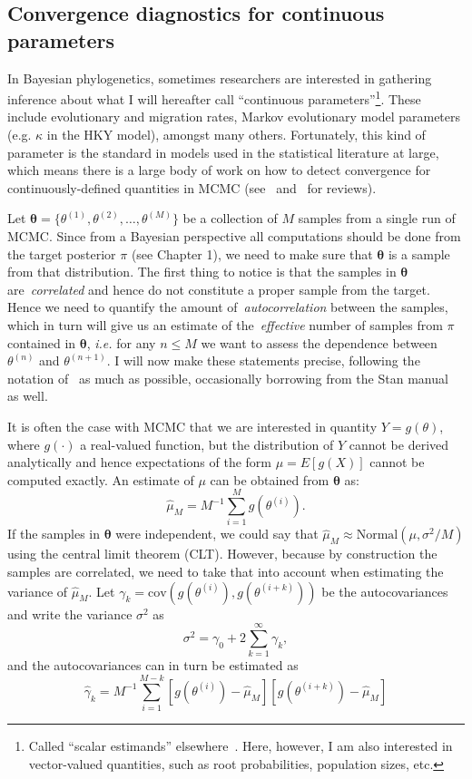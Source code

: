\subsection{Convergence diagnostics for continuous parameters}
\label{sec:continuous}

In Bayesian phylogenetics, sometimes researchers are interested in gathering inference about what I will hereafter call ``continuous parameters''\footnote{Called ``scalar estimands'' elsewhere~\citep{Gelman2014b}. Here, however, I am also interested in vector-valued quantities, such as root probabilities, population sizes,  etc.}.
These include evolutionary and migration rates, Markov evolutionary model parameters (e.g. $\kappa$ in the HKY model), amongst many others.
Fortunately, this kind of parameter is the standard in models used in the statistical literature at large, which means there is a large body of work on how to detect convergence for continuously-defined quantities in MCMC (see~\cite{Cowles1996} and~\cite{Mengersen1999} for reviews).

Let $\boldsymbol\theta = \{\theta^{(1)}, \theta^{(2)}, \ldots, \theta^{(M)}\}$ be a collection of $M$ samples from a single run of MCMC.
Since from a Bayesian perspective all computations should be done from the target posterior $\pi$ (see Chapter 1), we need to make sure that $\boldsymbol\theta$ is a sample from that distribution.
The first thing to notice is that the samples in $\boldsymbol\theta$ are~\textit{correlated} and hence do not constitute a proper sample from the target.
Hence we need to quantify the amount of~\textit{autocorrelation} between the samples, which in turn will give us an estimate of the~\textit{effective} number of samples from $\pi$ contained in $\boldsymbol\theta$, \textit{i.e.} for any $n \leq M$ we want to assess the dependence between $\theta^{(n)}$ and $\theta^{(n + 1)}$.
I will now make these statements precise, following the notation of~\cite{Geyer2011} as much as possible, occasionally borrowing from the Stan manual~\citep{StanTeam2017} as well.

It is often the case with MCMC that we are interested in quantity $Y = g(\theta)$, where $g(\cdot)$ a real-valued function, but the distribution of $Y$ cannot be derived analytically and hence expectations of the form $\mu = E[g(X)]$ cannot be computed exactly. 
An estimate of $\mu$ can be obtained from $\boldsymbol\theta$ as:
\[ \hat{\mu}_M = M^{-1}\sum_{i = 1}^M g(\theta^{(i)}). \]
If the samples in $\boldsymbol\theta$ were independent, we could say that $\hat{\mu}_M \approx \text{Normal} (\mu, \sigma^2/M)$ using the central limit theorem (CLT).
However, because by construction the samples are correlated, we need to take that into account when estimating the variance of $\hat{\mu}_M$.
Let $\gamma_k = \text{cov}(g(\theta^{(i)}), g(\theta^{(i + k)}))$ be the autocovariances and write the variance $\sigma^2$ as 
\[ \sigma^2 =  \gamma_0 + 2\sum_{k=1}^\infty \gamma_k,\]
and the autocovariances can in turn be estimated as 
\begin{equation}
\label{eq:autocovs}
 \hat{\gamma}_k = M^{-1}\sum_{i = 1}^{M-k}[g(\theta^{(i)}) - \hat{\mu}_M][g(\theta^{(i + k )}) - \hat{\mu}_M]
\end{equation}

